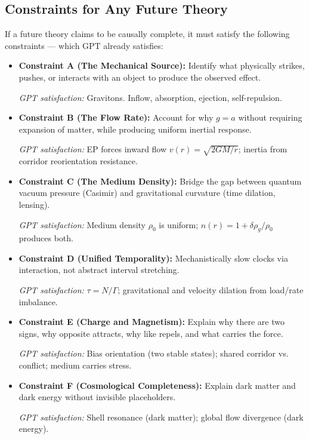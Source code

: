 \documentclass[12pt, a4paper]{article}
\begin{document}
\subsection{Constraints for Any Future Theory}
\label{subsec:future_constraints}

If a future theory claims to be causally complete, it must satisfy the following constraints — which GPT already satisfies:

\begin{itemize}
    \item \textbf{Constraint A (The Mechanical Source):} Identify what physically strikes, pushes, or interacts with an object to produce the observed effect.
    
    \textit{GPT satisfaction:} Gravitons. Inflow, absorption, ejection, self-repulsion.
    
    \item \textbf{Constraint B (The Flow Rate):} Account for why \( g = a \) without requiring expansion of matter, while producing uniform inertial response.
    
    \textit{GPT satisfaction:} EP forces inward flow \( v(r) = \sqrt{2GM/r} \); inertia from corridor reorientation resistance.
    
    \item \textbf{Constraint C (The Medium Density):} Bridge the gap between quantum vacuum pressure (Casimir) and gravitational curvature (time dilation, lensing).
    
    \textit{GPT satisfaction:} Medium density \( \rho_0 \) is uniform; \( n(r) = 1 + \delta \rho_g/\rho_0 \) produces both.
    
    \item \textbf{Constraint D (Unified Temporality):} Mechanistically slow clocks via interaction, not abstract interval stretching.
    
    \textit{GPT satisfaction:} \( \tau = N/\Gamma \); gravitational and velocity dilation from load/rate imbalance.
    
    \item \textbf{Constraint E (Charge and Magnetism):} Explain why there are two signs, why opposite attracts, why like repels, and what carries the force.
    
    \textit{GPT satisfaction:} Bias orientation (two stable states); shared corridor vs. conflict; medium carries stress.
    
    \item \textbf{Constraint F (Cosmological Completeness):} Explain dark matter and dark energy without invisible placeholders.
    
    \textit{GPT satisfaction:} Shell resonance (dark matter); global flow divergence (dark energy).
\end{itemize}
\end{document}
